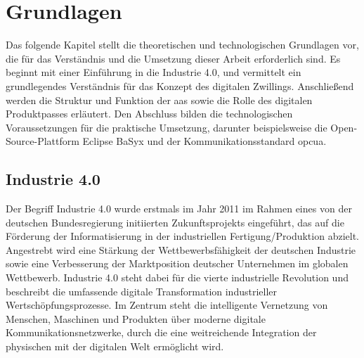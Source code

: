 \section{Grundlagen}
Das folgende Kapitel stellt die theoretischen und technologischen Grundlagen vor, die für das Verständnis und die Umsetzung dieser Arbeit erforderlich sind.
Es beginnt mit einer Einführung in die Industrie 4.0, und vermittelt ein grundlegendes Verständnis für das Konzept des digitalen Zwillings.
Anschließend werden die Struktur und Funktion der \acs{aas} sowie die Rolle des digitalen Produktpasses erläutert.
Den Abschluss bilden die technologischen Voraussetzungen für die praktische Umsetzung, darunter beispielsweise die Open-Source-Plattform Eclipse BaSyx und der Kommunikationsstandard \ac{opcua}.
\subsection{Industrie 4.0}

Der Begriff Industrie 4.0 wurde erstmals im Jahr 2011 im Rahmen eines von der deutschen Bundesregierung initiierten Zukunftsprojekts eingeführt, das auf die Förderung der Informatisierung in der industriellen Fertigung/Produktion abzielt.
Angestrebt wird eine Stärkung der Wettbewerbsfähigkeit der deutschen Industrie sowie eine Verbesserung der Marktposition deutscher Unternehmen im globalen Wettbewerb.
Industrie 4.0 steht dabei für die vierte industrielle Revolution und beschreibt die umfassende digitale Transformation industrieller Wertschöpfungsprozesse. 
Im Zentrum steht die intelligente Vernetzung von Menschen, Maschinen und Produkten über moderne digitale Kommunikationsnetzwerke, durch die eine weitreichende Integration der physischen mit der digitalen Welt ermöglicht wird.

